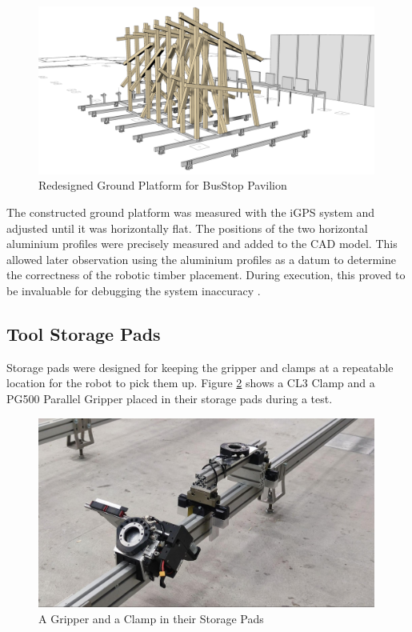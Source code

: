 \begin{figure}[!h]
    \centering
    \includegraphics[width=0.99\textwidth]{images/6a/img01.jpg}
    \caption{Redesigned Ground Platform for BusStop Pavilion}
    \label{fig:platform-redesign}
\end{figure}


The constructed ground platform was measured with the iGPS system and adjusted until it was horizontally flat. The positions of the two horizontal aluminium profiles were precisely measured and added to the CAD model. This allowed later observation using the aluminium profiles as a datum to determine the correctness of the robotic timber placement. During execution, this proved to be invaluable for debugging the system inaccuracy .

\subsection{Tool Storage Pads}
\label{subsection:exploration-3-tool-storage-pads}

Storage pads were designed for keeping the gripper and clamps at a repeatable location for the robot to pick them up. Figure \ref{fig:tool-in-storage-pad} shows a CL3 Clamp and a PG500 Parallel Gripper placed in their storage pads during a test.

\begin{figure}[!h]
    \centering
    \includegraphics[width=0.99\textwidth]{images/6a/img02.jpg}
    \caption{A Gripper and a Clamp in their Storage Pads}
    \label{fig:tool-in-storage-pad}
\end{figure}



